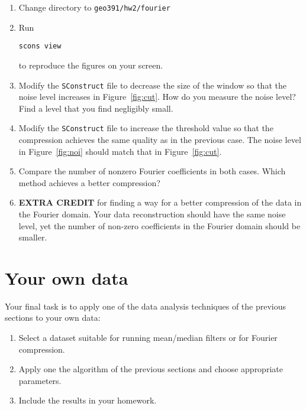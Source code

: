 

\begin{enumerate}
\item Change directory to \verb#geo391/hw2/fourier#
\item Run 
\begin{verbatim}
scons view
\end{verbatim}
to reproduce the figures on your screen.
\item Modify the \texttt{SConstruct} file to decrease the size of the window so that the noise level increases in Figure~\ref{fig:cut}. How do you measure the noise level? Find a level that you find negligibly small.
\item Modify the \texttt{SConstruct} file to increase the threshold value so that the compression achieves the same quality as in the previous case. The noise level in Figure~\ref{fig:noi} should match that in Figure~\ref{fig:cut}.
\item Compare the number of nonzero Fourier coefficients in both cases. Which method achieves a better compression?
\item \textbf{EXTRA CREDIT} for finding a way for a better compression of the data in the Fourier domain. Your data reconstruction should have 
the same noise level, yet the number of non-zero coefficients in the Fourier domain should be smaller.
\end{enumerate}



\newpage

\section{Your own data}

Your final task is to apply one of the data analysis techniques of the
previous sections to your own data:
\begin{enumerate}
\item Select a dataset suitable for
running mean/median filters or for Fourier compression.
\item Apply one the algorithm of the previous sections and choose
  appropriate parameters.
\item Include the results in your homework.
\end{enumerate}


